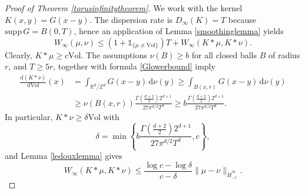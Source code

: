 \documentclass[11pt,a4paper]{article}
\theoremstyle{definition}
\begin{document}
\begin{proof}[Proof of Theorem \ref{torusinfinitytheorem}]
We work with the kernel $K(x,y)=G(x-y)$. The dispersion rate is $D_{\infty}(K)=T$ because $\mathrm{supp} \, G = B(0,T)$, hence an application of Lemma \ref{smoothinglemma} yields
\[ W_{\infty} (\mu, \nu) \le \left( 1+\mathds{1}_{\{ \mu \neq \mathrm{Vol} \}} \right) T + W_{\infty} (K * \mu, K * \nu) . \]
Clearly, $K*\mu \ge c \mathrm{Vol}$. The assumptions $\nu (B) \ge b$ for all closed balls $B$ of radius $r$, and $T \ge 5r$, together with formula \eqref{Glowerbound} imply
\[ \begin{split} \frac{\mathrm{d}(K*\nu)}{\mathrm{d}\mathrm{Vol}}(x) &= \int_{\mathbb{R}^d / \mathbb{Z}^d} G(x-y) \, \mathrm{d}\nu (y) \ge \int_{B(x,r)} G(x-y) \, \mathrm{d}\nu (y) \\ &\ge \nu (B(x,r)) \frac{\Gamma \left( \frac{d+2}{2} \right) 2^{d+1}}{27 \pi^{d/2} T^d} \ge b \frac{\Gamma \left( \frac{d+2}{2} \right) 2^{d+1}}{27 \pi^{d/2} T^d} . \end{split} \]
In particular, $K*\nu \ge \delta \mathrm{Vol}$ with
\[ \delta = \min \left\{ b \frac{\Gamma \left( \frac{d+2}{2} \right) 2^{d+1}}{27 \pi^{d/2} T^d}, c \right\} , \]
and Lemma \ref{ledouxlemma} gives
\[ W_{\infty} (K*\mu, K*\nu) \le \frac{\log c - \log \delta}{c-\delta} \| \mu-\nu \|_{\dot{H}_{-1}^{\infty}} . \]


\end{proof}
\end{document}
